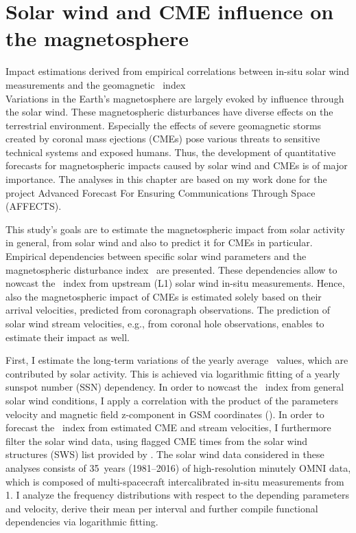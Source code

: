 
\chapter{Solar wind and CME influence on the magnetosphere}
\label{chap:chapter2}

Impact estimations derived from empirical correlations between in-situ solar wind measurements and the geomagnetic \Kp{}~index\\


Variations in the Earth's magnetosphere are largely evoked by influence through the solar wind. These magnetospheric disturbances have diverse effects on the terrestrial environment. Especially the effects of severe geomagnetic storms created by coronal mass ejections (CMEs) pose various threats to sensitive technical systems and exposed humans. Thus, the development of quantitative forecasts for magnetospheric impacts caused by solar wind and CMEs is of major importance. The analyses in this chapter are based on my work done for the project Advanced Forecast For Ensuring Communications Through Space (AFFECTS).

This study's goals are to estimate the magnetospheric impact from solar activity in general, from solar wind and also to predict it for CMEs in particular. Empirical dependencies between specific solar wind parameters and the magnetospheric disturbance index~\Kp{} are presented. These dependencies allow to nowcast the \Kp~index from upstream (L1) solar wind in-situ measurements. Hence, also the magnetospheric impact of CMEs is estimated solely based on their arrival velocities, predicted from coronagraph observations. The prediction of solar wind stream velocities, e.g., from coronal hole observations, enables to estimate their impact as well.

First, I estimate the long-term variations of the yearly average \Kp{}~values, which are contributed by solar activity. This is achieved via logarithmic fitting of a yearly sunspot number (SSN) dependency. In order to nowcast the \Kp~index from general solar wind conditions, I apply a correlation with the product of the parameters velocity and magnetic field z-component in GSM coordinates (\vBz{}). In order to forecast the \Kp~index from estimated CME and stream velocities, I furthermore filter the solar wind data, using flagged CME times from the solar wind structures (SWS) list provided by \citet{Richardson2012}. The solar wind data considered in these analyses consists of 35~years (1981--2016) of high-resolution minutely OMNI data, which is composed of multi-spacecraft intercalibrated in-situ measurements from \SI{1}{\au}. I analyze the \Kp{} frequency distributions with respect to the depending parameters \vBz{} and velocity, derive their mean \Kp{} per interval and further compile functional dependencies via logarithmic fitting.

